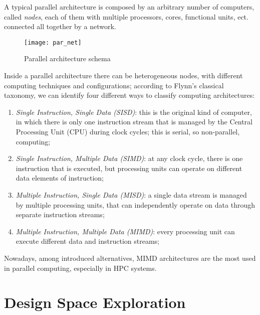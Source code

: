 A typical parallel architecture is composed by an arbitrary number of computers, called \textit{nodes}, each of them with multiple processors, cores, functional units, ect. connected all together by a network.

\begin{figure}[htb]

    \centering
    \texttt{[image: par\_net]}
    \caption{Parallel architecture schema}

\end{figure}

Inside a parallel architecture there can be heterogeneous nodes, with different computing techniques and configurations; according to Flynn's classical taxonomy, we can identify four different ways to classify computing architectures: 

\begin{enumerate}

    \item \textit{Single Instruction, Single Data (SISD)}: this is the original kind of computer, in which there is only one instruction stream that is managed by the Central Processing Unit (CPU) during clock cycles; this is serial, so non-parallel, computing;
    
    \item \textit{Single Instruction, Multiple Data (SIMD)}: at any clock cycle, there is one instruction that is executed, but processing units can operate on different data elements of instruction;
    
    \item \textit{Multiple Instruction, Single Data (MISD)}: a single data stream is managed by multiple processing units, that can independently operate on data through separate instruction streams;
    
    \item \textit{Multiple Instruction, Multiple Data (MIMD)}: every processing unit can execute different data and instruction streams;

\end{enumerate}

Nowadays, among introduced alternatives, MIMD architectures are the most used in parallel computing, especially in HPC systems.





\section{Design Space Exploration}


